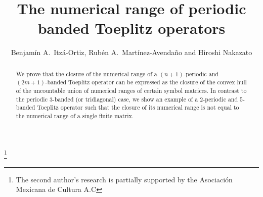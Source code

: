 \documentclass[12pt,reqno]{amsart}
\theoremstyle{definition}
\begin{document}
\title{The numerical range of periodic banded Toeplitz operators}
 
\author[B.A. Itz\'a-Ortiz, R.A. Mart\'inez-Avenda\~no, and H. Nakazato]{Benjam\'in A.~Itz\'a-Ortiz, Rub\'en A.~Mart\'inez-Avenda\~no and Hiroshi Nakazato}


\address{Universidad Aut\'onoma del Estado de Hidalgo}
\address{Instituto Tecnol\'ogico Aut\'onomo de M\'exico}
\address{Hirosaki University}

\thanks{The second author's research is partially supported by the Asociaci\'on Mexicana de Cultura A.C}


\maketitle 

 \begin{abstract}
     We prove that the closure of the numerical range of a $(n+1)$-periodic and $(2m+1)$-banded Toeplitz operator can be expressed as the closure of the convex hull of the uncountable union of numerical ranges of certain symbol matrices.  In contrast to the periodic $3$-banded (or tridiagonal) case, we show an example of a $2$-periodic and $5$-banded Toeplitz operator such that the closure of its numerical range is not equal to the numerical range of a single finite matrix.
 \end{abstract}
\end{document}
